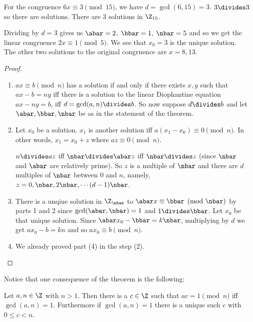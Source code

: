 \documentclass[oneside,12pt]{amsart}
\begin{document}
\begin{example}
For the congruence $6x \equiv 3 \pmod{15}$, we have $d=\gcd(6, 15) = 3$. $3\divides 3$ so there
are solutions. There are 3 solutions in $\Z_{15}$.

Dividing by $d=3$ gives us $\abar=2$, $\bbar= 1$, $\nbar= 5$ and so we get
the linear congruence $2x \equiv 1 \pmod{5}$. We see that $x_0=3$ is the unique
solution. The other two solutions to the original congruence are $x=8,13$.
\end{example}

\begin{proof}
\begin{enumerate}
\item $ax\equiv b \pmod n$ has a solution if and only if there exists $x,y$ such that
$ax - b = ny$ iff there is a solution to the linear Diophantine equation $ax - ny = b$,
iff $d= \gcd(a,n) \divides b$. So now suppose $d\divides b$ and let $\abar,\bbar,\nbar$
be as in the statement of the theorem.
\item Let $x_0$ be a solution. $x_1$ is another solution iff $a(x_1 - x_0) \equiv 0 \pmod n$.
In other words, $x_1 = x_0 + z$ where $az \equiv 0 \pmod n$.

$n\divides az$ iff $\nbar\divides \abar z$ iff $\nbar\divides z$ (since $\nbar$ and $\abar$ are relatively prime). 
So $z$ is a multiple of $\nbar$ and there are $d$ multiples of $\nbar$ between $0$ and $n$, namely,
$z=0,\nbar,2\nbar,\cdots (d-1)\nbar$.

\item There is a unqiue solution in $\Z_{\nbar}$ to $\abar x \equiv \bbar \pmod \nbar$ by parts 1 and 2
since $\gcd(\abar,\nbar) = 1$ and $1\divides \bbar$. Let $x_0$ be that unique solution.
Since $\abar x_0 -\bbar = k\nbar$, multiplying by $d$ we get $ax_0 - b = kn$ and so
$ax_0 \equiv b \pmod n$.

\item We already proved part (4) in the step (2).
\end{enumerate}
\end{proof}

Notice that one consequence of the theorem is the following:

\begin{corollary}
Let $a,n\in \Z$ with $n>1$. Then there is a $c\in\Z$ such that $ac=1 \pmod n$ iff $\gcd(a,n) = 1$. Furthermore if $\gcd(a,n)=1$
there is a unique such $c$ with $0\leq c < n$.
\end{corollary}
\end{document}
